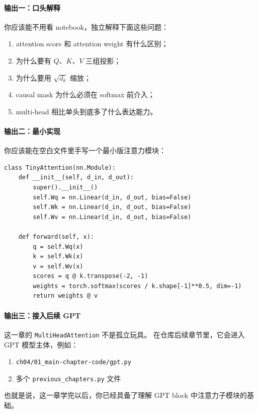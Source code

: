 \documentclass[12pt,a4paper]{ctexart}
\newcommand{\filepath}[1]{\texttt{#1}}
\newcommand{\code}[1]{\texttt{#1}}
\begin{document}
\paragraph{输出一：口头解释}
你应该能不用看 notebook，独立解释下面这些问题：

\begin{enumerate}
  \item attention score 和 attention weight 有什么区别；
  \item 为什么要有 \(Q\)、\(K\)、\(V\) 三组投影；
  \item 为什么要用 \(\sqrt{d_k}\) 缩放；
  \item causal mask 为什么必须在 softmax 前介入；
  \item multi-head 相比单头到底多了什么表达能力。
\end{enumerate}

\paragraph{输出二：最小实现}
你应该能在空白文件里手写一个最小版注意力模块：

\begin{lstlisting}[style=py]
class TinyAttention(nn.Module):
    def __init__(self, d_in, d_out):
        super().__init__()
        self.Wq = nn.Linear(d_in, d_out, bias=False)
        self.Wk = nn.Linear(d_in, d_out, bias=False)
        self.Wv = nn.Linear(d_in, d_out, bias=False)

    def forward(self, x):
        q = self.Wq(x)
        k = self.Wk(x)
        v = self.Wv(x)
        scores = q @ k.transpose(-2, -1)
        weights = torch.softmax(scores / k.shape[-1]**0.5, dim=-1)
        return weights @ v
\end{lstlisting}

\paragraph{输出三：接入后续 GPT}
这一章的 \code{MultiHeadAttention} 不是孤立玩具。
在仓库后续章节里，它会进入 GPT 模型主体，例如：

\begin{enumerate}
  \item \filepath{ch04/01\_main-chapter-code/gpt.py}
  \item 多个 \filepath{previous\_chapters.py} 文件
\end{enumerate}

也就是说，这一章学完以后，你已经具备了理解 GPT block 中注意力子模块的基础。
\end{document}
